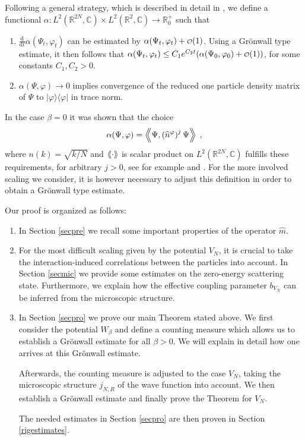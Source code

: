 \documentclass[11pt, english, american]{article}
\newcommand{\landau}{\mbox{\begin{scriptsize}$\mathcal{O}$\end{scriptsize}}}
\newcommand{\llaa}{\left\langle\hspace{-0.14cm}\left\langle}
\newcommand{\rraa}{\right\rangle\hspace{-0.14cm}\right\rangle}
\newcommand{\laa}{\langle\hspace{-0.08cm}\langle}
\newcommand{\raa}{\rangle\hspace{-0.08cm}\rangle}
\newcommand{\LZ}{L^2(\mathbb{R}^2,\mathbb{C})}
\newcommand{\LZN}{L^2(\mathbb{R}^{2N},\mathbb{C})}
\newcommand{\dt}{\frac{\text{d}}{\text{d}t}}
\renewcommand{\phi}{\varphi}
\begin{document}
Following a general strategy, which is described in detail in \cite{pickl1}, we define a functional $\alpha:\LZN\times\LZ\to\mathbb{R}^+_0$ such that
\begin{enumerate}
 \item

$\dt\alpha(\Psi_t,\phi_t)$ can be estimated by $\alpha(\Psi_t,\phi_t)+\landau(1)$.
Using a Gr\"onwall type estimate, it then follows that
$\alpha(\Psi_t,\phi_t) \leq C_1 e^{C_2 t}(\alpha(\Psi_0,\phi_0) + \landau(1))$, for some constants $C_1,C_2>0$.

\item $\alpha(\Psi,\phi)\to0$
implies convergence of the reduced one particle density matrix of $\Psi$ to
$|\phi\rangle\langle\phi|$ in trace norm.
\end{enumerate}
In the case $\beta=0$ it was shown that the choice $$\alpha(\Psi,\phi)=\llaa\Psi,
\left(\widehat{n}^{\phi}\right)^j\Psi\rraa \;,$$ 
where
$n(k)=\sqrt{k/N}$ and $\laa\cdot\raa$ is scalar product on $\LZN$  fulfills these requirements, for arbitrary $j>0$, see for example \cite{pickl1} and \cite{knowles}. For the more involved scaling we consider, it is however necessary to adjust this definition in order to obtain a Gr\"onwall type estimate.

Our proof is organized as follows:
\begin{enumerate}

\item 
In Section \ref{secpre} we recall some important properties of the operator $\widehat{m}$. 



\item For the most difficult scaling given by the potential $V_N$, it is crucial to take the interaction-induced correlations between the particles into account. In Section \ref{secmic} we
provide some estimates on the zero-energy scattering state. Furthermore, we explain how the effective coupling parameter $b_{V_N}$ can be inferred from the microscopic structure.



\item
In Section \ref{secpro} we prove our main Theorem stated above. We first consider the potential $W_\beta$ and define a counting measure which allows us to establish a Gr\"onwall estimate for  all $\beta>0$. We will explain in detail how one arrives at this Gr\"onwall estimate.

Afterwards, the counting measure is adjusted to the case $V_N$, taking the microscopic structure $j_{N,R}$ of the wave function into account. We then establish  a Gr\"onwall estimate and finally prove the Theorem for $V_N$. 

The needed estimates in Section \ref{secpro} are then proven in Section \ref{rigestimates}.
\end{enumerate}
\end{document}
